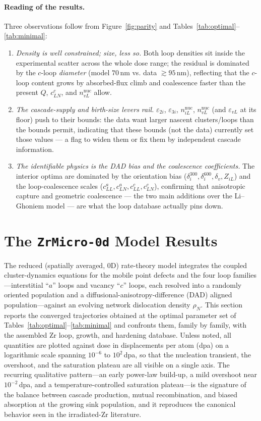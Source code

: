 \documentclass{article}
\begin{document}
\paragraph{Reading of the results.}
Three observations follow from Figure~\ref{fig:parity} and
Tables~\ref{tab:optimal}--\ref{tab:minimal}:
\begin{enumerate}\itemsep2pt
\item \emph{Density is well constrained; size, less so.} Both loop densities sit
inside the experimental scatter across the whole dose range; the residual is
dominated by the $c$-loop \emph{diameter} (model $70\,$nm vs. data
$\gtrsim 95\,$nm), reflecting that the $c$-loop content grows by absorbed-flux
climb and coalescence faster than the present $Q$, $c_{LN}^c$, and
$n_{vL}^{\mathrm{nuc}}$ allow.
\item \emph{The cascade-supply and birth-size levers rail.} $\varepsilon_{2i}$,
$\varepsilon_{3i}$, $n_{iL}^{\mathrm{nuc}}$, $n_{vL}^{\mathrm{nuc}}$ (and
$\varepsilon_{vL}$ at its floor) push to their bounds: the data want larger
nascent clusters/loops than the bounds permit, indicating that these bounds (not the
data) currently set those values — a flag to widen them or fix them by
independent cascade information.
\item \emph{The identifiable physics is the DAD bias and the coalescence
coefficients.} The interior optima are dominated by the orientation bias
($\delta_i^{300},\delta_i^{600},\delta_v,Z_{iL}$) and the loop-coalescence scales
($c_{LL}^a,c_{LN}^a,c_{LL}^c,c_{LN}^c$), confirming that anisotropic capture and
geometric coalescence — the two main additions over the Li–Ghoniem model —
are what the loop database actually pins down.
\end{enumerate}

\section{The \texttt{ZrMicro-0d} Model Results}


The reduced (spatially averaged, $0$D) rate-theory model integrates the coupled cluster-dynamics equations for the mobile point defects and the four loop families---interstitial ``$a$'' loops and vacancy ``$c$'' loops, each resolved into a randomly oriented population and a diffusional-anisotropy-difference (DAD) aligned population---against an evolving network dislocation density $\rho_N$. This section reports the converged trajectories obtained at the optimal parameter set of Tables~\ref{tab:optimal}--\ref{tab:minimal} and confronts them, family by family, with the assembled Zr loop, growth, and hardening database. Unless noted, all quantities are plotted against dose in displacements per atom (dpa) on a logarithmic scale spanning $10^{-6}$ to $10^{2}\,$dpa, so that the nucleation transient, the overshoot, and the saturation plateau are all visible on a single axis. The recurring qualitative pattern---an early power-law build-up, a mild overshoot near $10^{-2}\,$dpa, and a temperature-controlled saturation plateau---is the signature of the balance between cascade production, mutual recombination, and biased absorption at the growing sink population, and it reproduces the canonical behavior seen in the irradiated-Zr literature.
\end{document}
